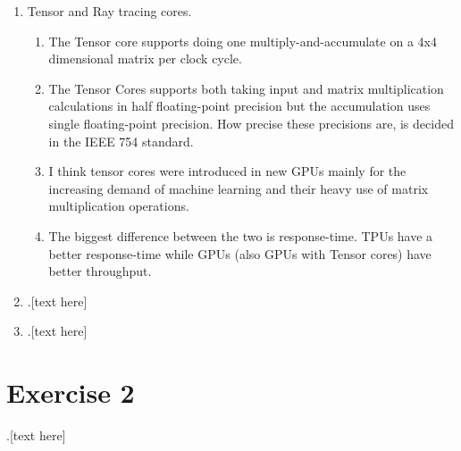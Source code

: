 \documentclass[a4paper, 12pt]{article}
\begin{document}
\begin{enumerate}
	\item Tensor and Ray tracing cores.
	\begin{enumerate}
		\item The Tensor core supports doing one multiply-and-accumulate on a 4x4 dimensional matrix per clock cycle.
		
		\item The Tensor Cores supports both taking input and matrix multiplication calculations in half floating-point precision but the accumulation uses single floating-point precision. How precise these precisions are, is decided in the IEEE 754 standard.
		
		\item I think tensor cores were introduced in new GPUs mainly for the increasing demand of machine learning and their heavy use of matrix multiplication operations.
		
		
		
		\item The biggest difference between the two is response-time. TPUs have a better response-time while GPUs (also GPUs with Tensor cores) have better throughput.
		
	\end{enumerate}

	\item .[text here]
	
	\item .[text here]
\end{enumerate}

\section{Exercise 2}
.[text here]
\end{document}
